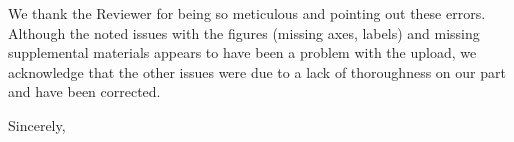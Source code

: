 \documentclass[ucm,12pt]{ucletter}
\begin{document}
\begin{letter}
 We thank the Reviewer for being so meticulous and pointing out these errors. Although the noted issues with the figures (missing axes, labels) and missing supplemental materials appears to have been a problem with the upload, we acknowledge that the other issues were due to a lack of thoroughness on our part and have been corrected.

\vspace{5mm}

\singlespacing
\closing{Sincerely,\\
\\
}

\end{letter}
\end{document}
